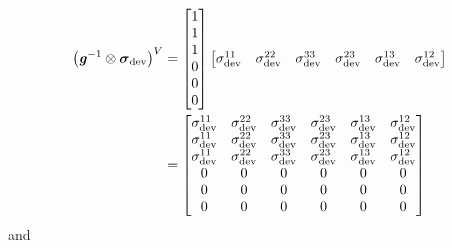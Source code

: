 \begin{equation}
  \begin{split}
    \left(   {\boldsymbol{\mathit{g}}}^{-1}  \otimes \boldsymbol{\mathit{\sigma}}_{\operatorname{dev}}  \right)^{V}&=\begin{bmatrix}
    1 \\
    1 \\
    1 \\
    0 \\
    0 \\
    0
    \end{bmatrix}\begin{bmatrix}
      \sigma_{\operatorname{dev}}^{11} & \sigma_{\operatorname{dev}}^{22} & \sigma_{\operatorname{dev}}^{33} & \sigma_{\operatorname{dev}}^{23} & \sigma_{\operatorname{dev}}^{13} & \sigma_{\operatorname{dev}}^{12}
    \end{bmatrix}\\
    &=\begin{bmatrix}
    \sigma_{\operatorname{dev}}^{11} & \sigma_{\operatorname{dev}}^{22} & \sigma_{\operatorname{dev}}^{33} &
    \sigma_{\operatorname{dev}}^{23} & \sigma_{\operatorname{dev}}^{13} & \sigma_{\operatorname{dev}}^{12} \\
    \sigma_{\operatorname{dev}}^{11} & \sigma_{\operatorname{dev}}^{22} & \sigma_{\operatorname{dev}}^{33} &
    \sigma_{\operatorname{dev}}^{23} & \sigma_{\operatorname{dev}}^{13} & \sigma_{\operatorname{dev}}^{12} \\
    \sigma_{\operatorname{dev}}^{11} & \sigma_{\operatorname{dev}}^{22} & \sigma_{\operatorname{dev}}^{33} &
    \sigma_{\operatorname{dev}}^{23} & \sigma_{\operatorname{dev}}^{13} & \sigma_{\operatorname{dev}}^{12} \\
    0 & 0 & 0 & 0 & 0 & 0 \\
    0 & 0 & 0 & 0 & 0 & 0 \\
    0 & 0 & 0 & 0 & 0 & 0
    \end{bmatrix}
  \end{split} 
\end{equation}
and
